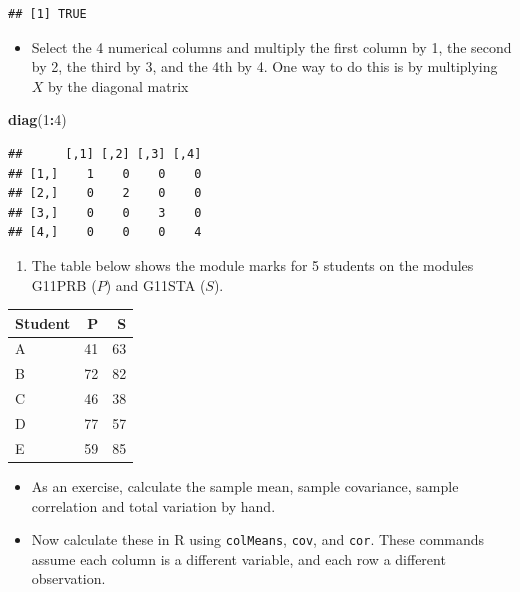 \documentclass[
]{book}
\newenvironment{Shaded}{\begin{snugshade}}{\end{snugshade}}
\newcommand{\DecValTok}[1]{\textcolor[rgb]{0.00,0.00,0.81}{#1}}
\newcommand{\FunctionTok}[1]{\textcolor[rgb]{0.13,0.29,0.53}{\textbf{#1}}}
\newcommand{\NormalTok}[1]{#1}
\newcommand{\SpecialCharTok}[1]{\textcolor[rgb]{0.81,0.36,0.00}{\textbf{#1}}}
\providecommand{\tightlist}{%
  \setlength{\itemsep}{0pt}\setlength{\parskip}{0pt}}
\theoremstyle{definition}
\theoremstyle{definition}
\theoremstyle{definition}
\theoremstyle{definition}
\theoremstyle{remark}
\begin{document}
\begin{verbatim}
## [1] TRUE
\end{verbatim}

\begin{itemize}
\tightlist
\item
  Select the 4 numerical columns and multiply the first column by 1, the second by 2, the third by 3, and the 4th by 4. One way to do this is by multiplying \(X\) by the diagonal matrix
\end{itemize}

\begin{Shaded}
\begin{Highlighting}[]
\FunctionTok{diag}\NormalTok{(}\DecValTok{1}\SpecialCharTok{:}\DecValTok{4}\NormalTok{)}
\end{Highlighting}
\end{Shaded}

\begin{verbatim}
##      [,1] [,2] [,3] [,4]
## [1,]    1    0    0    0
## [2,]    0    2    0    0
## [3,]    0    0    3    0
## [4,]    0    0    0    4
\end{verbatim}

\begin{enumerate}
\def\labelenumi{\arabic{enumi}.}
\setcounter{enumi}{1}
\tightlist
\item
  The table below shows the module marks for 5 students on the modules G11PRB (\(P\)) and G11STA (\(S\)).
\end{enumerate}

\begin{table}
\centering
\begin{tabular}{lrr}
\toprule
Student & P & S\\
\midrule
A & 41 & 63\\
B & 72 & 82\\
C & 46 & 38\\
D & 77 & 57\\
E & 59 & 85\\
\bottomrule
\end{tabular}
\end{table}

\begin{itemize}
\tightlist
\item
  As an exercise, calculate the sample mean, sample covariance, sample correlation and total variation by hand.
\end{itemize}

\begin{itemize}
\tightlist
\item
  Now calculate these in R using \texttt{colMeans}, \texttt{cov}, and \texttt{cor}. These commands assume each column is a different variable, and each row a different observation.
\end{itemize}
\end{document}
